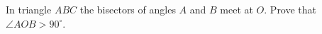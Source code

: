 In triangle $ABC$ the bisectors of angles $A$ and $B$ meet at $O$. Prove that $\angle AOB>90^\circ$.
